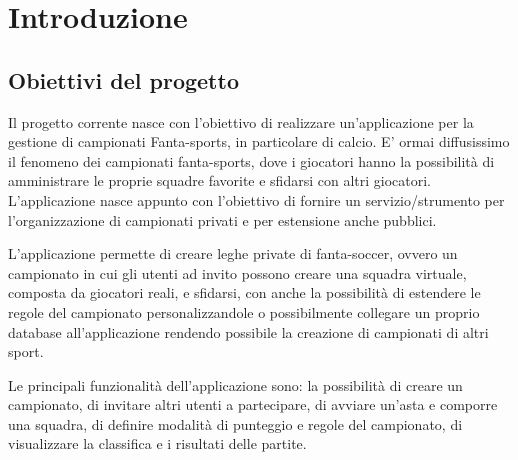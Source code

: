 \documentclass[twoside,openright,titlepage,fleqn,headinclude,12pt,a4paper,BCOR=5mm,footinclude]{scrbook}
\begin{document}
\clearpage
\chapter{Introduzione}
\section{Obiettivi del progetto}
Il progetto corrente nasce con l'obiettivo di realizzare un'applicazione per la gestione di campionati Fanta-sports, in particolare di calcio.
E' ormai diffusissimo il fenomeno dei campionati fanta-sports, dove i giocatori hanno la possibilità di amministrare le proprie squadre favorite e 
sfidarsi con altri giocatori. L'applicazione nasce appunto con l'obiettivo di fornire un servizio/strumento per l'organizzazione di campionati privati e
per estensione anche pubblici.

L'applicazione permette di creare leghe private di fanta-soccer, ovvero un campionato in cui gli utenti ad invito possono creare una squadra virtuale, 
composta da giocatori reali, e sfidarsi, con anche la possibilità di estendere le regole del campionato personalizzandole o possibilmente collegare
un proprio database all'applicazione rendendo possibile la creazione di campionati di altri sport.

Le principali funzionalità dell'applicazione sono: la possibilità di creare un campionato, di invitare altri utenti a partecipare, di avviare un'asta 
e comporre una squadra, di definire modalità di punteggio e regole del campionato, di visualizzare la classifica e i risultati delle partite.
\end{document}
